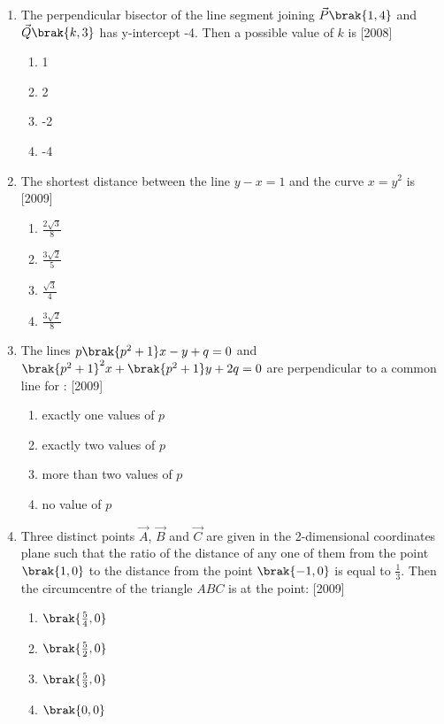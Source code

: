 \begin{enumerate}
\item The perpendicular bisector of the line segment joining $\vec{P}\brak{1,4}$ and $\vec{Q}\brak{k, 3}$ has y-intercept -4. Then a possible value of $k$ is \hfill{[2008]}
\begin{multicols}{4}
\begin{enumerate}
\item 1
\item 2
\item -2
\item -4
\end{enumerate}
\end{multicols} 

\item The shortest distance between the line $y- x =1$ and the 
curve $x=y^{2}$ is \hfill{[2009]}
\begin{multicols}{4}
\begin{enumerate}
\item $\frac{2\sqrt{3}}{8}$
\item $\frac{3\sqrt{2}}{5}$
\item $\frac{\sqrt{3}}{4}$
\item $\frac{3\sqrt{2}}{8}$
\end{enumerate}
\end{multicols}

\item The lines $p\brak{p^{2}+1}x-y+q=0$ and $\brak{p^{2}+1}^{2}x+\brak{p^{2}+1}y+ 2q=0$ are perpendicular to a common line for : \hfill{[2009]}
\begin{enumerate}
\item exactly one values of $p$
\item exactly two values of $p$ 
\item more than two values of $p$ 
\item no value of $p$ 
\end{enumerate}

\item Three distinct points $\vec{A}$, $\vec{B}$ and $\vec{C}$ are given in the 
2-dimensional coordinates plane such that the ratio of the 
distance of any one of them from the point $\brak{1, 0}$ to the distance from
the point $\brak{-1, 0}$ is equal to $\frac{1}{3}$. Then the circumcentre of the triangle $ABC$ is at the point: \hfill{[2009]}
\begin{multicols}{4}
\begin{enumerate}
\item $\brak{\frac{5}{4}, 0}$
\item $\brak{\frac{5}{2}, 0}$
\item $\brak{\frac{5}{3}, 0}$
\item $\brak{0, 0}$
\end{enumerate}
\end{multicols} 


\end{enumerate}
